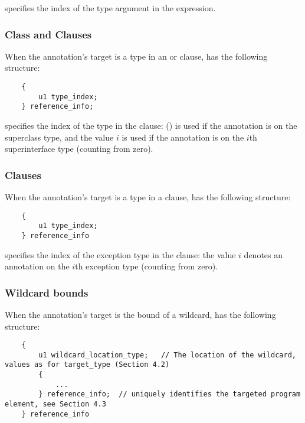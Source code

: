 \documentclass[10pt]{article}
\begin{document}
 specifies the index of the type argument in the
expression.

\subsubsection{Class  and  Clauses\label{class-file:ext:ri:extends}}

When the annotation's target is a type in an  or
 clause,  has the following
structure:

\begin{Verbatim}
    {
        u1 type_index;
    } reference_info;
\end{Verbatim}

 specifies the index of the type in the clause:
 () is used if the annotation is on the superclass
type, and the value $i$ is used if the annotation is on the $i$th
superinterface type (counting from zero).

\subsubsection{ Clauses\label{class-file:ext:ri:throws}}
When the annotation's target is a type in a  clause,
 has the following structure:

\begin{Verbatim}
    {
        u1 type_index;
    } reference_info
\end{Verbatim}

 specifies the index of the exception type in the
clause: the value $i$ denotes an annotation on the $i$th exception
type (counting from zero).

\subsubsection{Wildcard bounds\label{class-file:ext:ri:wildcard}}

When the annotation's target is the bound of a wildcard,
 has the following structure:

\begin{Verbatim}
    {
        u1 wildcard_location_type;   // The location of the wildcard, values as for target_type (Section 4.2)
        {
            ...
        } reference_info;  // uniquely identifies the targeted program element, see Section 4.3
    } reference_info
\end{Verbatim}
\end{document}

